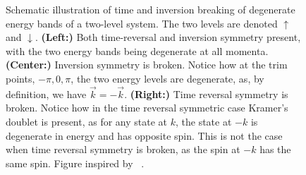 \begin{figure}[h]
  \caption{Schematic illustration of time and inversion breaking of degenerate energy bands of a two-level system.
    The  two levels are denoted $\uparrow$ and $\downarrow$.
    \textbf{(Left:)} Both time-reversal and inversion symmetry present, with the two energy bands being degenerate at all momenta.
    \textbf{(Center:)} Inversion symmetry is broken. Notice how at the \gls{trim} points, $-\pi, 0, \pi$, the two energy levels are degenerate, as, by definition, we have $\vec{k} = -\vec{k}$.
    \textbf{(Right:)} Time reversal symmetry is broken.
    Notice how in the time reversal symmetric case Kramer's doublet is present, as for any state at $k$, the state at $-k$ is degenerate  in energy and has opposite spin.
    This is not the case when time reversal symmetry is broken, as the spin at  $-k$ has the same spin.
    Figure inspired by \citeauthor{ramazashviliZeemanSpinorbitCoupling2019}~\cite{ramazashviliZeemanSpinorbitCoupling2019}.
  }
  \label{fig:symmetry_considerations}
\end{figure}

